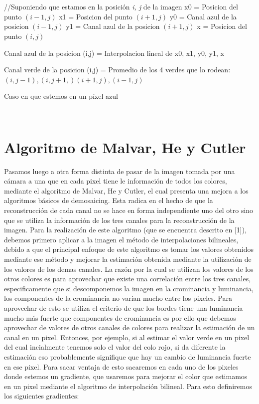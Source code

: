\documentclass[10pt, a4paper]{article}
\begin{document}
\ \\
\ \\
\begin{algorithm}[H]
//Suponiendo que estamos en la posici\'on \textit{i, j} de la imagen
x0 = Posicion del punto $(i-1,j)$\;
x1 = Posicion del punto $(i+1,j)$\;
y0 = Canal azul de la posicion $(i-1,j)$\;
y1 = Canal azul de la posicion $(i+1,j)$\;
x = Posicion del punto $(i,j)$\;

Canal azul de la posicion (i,j) = Interpolacion lineal de x0, x1, y0, y1, x\;

Canal verde de la posicion (i,j) = Promedio de los 4 verdes que lo rodean: $(i,j-1),(i,j+1,)(i+1,j),(i-1,j)$\;

\caption{Caso en que estemos en un p\'ixel azul}
\end{algorithm} 
\ \\


\section{Algoritmo de Malvar, He y Cutler}

Pasamos luego a otra forma distinta de pasar de la imagen tomada por una c\'amara a una que en cada pixel tiene le informaci\'on de todos los colores, mediante el algoritmo de Malvar, He y Cutler, el cual presenta una mejora a los algoritmos b\'asicos de demosaicing. Esta radica en el hecho de que la reconstrucci\'on de cada canal no se hace en forma independiente uno del otro sino que se utiliza la informaci\'on de los tres canales para la reconstrucci\'on de la imagen.
Para la realizaci\'on de este algoritmo (que se encuentra descrito en [1]), debemos primero aplicar a la imagen el m\'etodo de interpolaciones bilineales, debido a que el principal enfoque de este algoritmo es tomar los valores obtenidos mediante ese m\'etodo y mejorar la estimaci\'on obtenida mediante la utilizaci\'on de los valores de los demas canales. La raz\'on por la cual se utilizan los valores de los otros colores es para aprovechar que existe una correlaci\'on entre los tres canales, especificamente que si descomponemos la imagen en la crominancia y luminancia, los componentes de la crominancia no varian mucho entre los pixeles. Para aprovechar de esto se utiliza el criterio de que los bordes tiene una luminancia mucho m\'as fuerte que componentes de crominancia es por ello que debemos aprovechar de valores de otros canales de colores para realizar la estimaci\'on de un canal en un pixel. Entonces, por ejemplo, si al estimar el valor verde en un pixel del cual incialmente tenemos solo el valor del colo rojo, si da diferente la estimaci\'on eso probablemente signifique que hay un cambio de luminancia fuerte en ese pixel. Para sacar ventaja de esto sacaremos en cada uno de los pixeles donde estemos un gradiente, que usaremos para mejorar el color que estimamos en un pixel mediante el algoritmo de interpolaci\'on bilineal. Para esto definiremos los siguientes gradientes:
\end{document}
